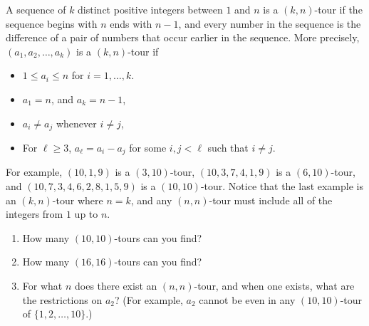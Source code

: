 A sequence of $k$ distinct positive integers between $1$ and $n$ is a $(k,n)$-tour if the sequence begins with $n$ ends with $n-1$, and every number in the sequence is the difference of a pair of numbers that occur earlier in the sequence. More precisely, $(a_{1},a_{2},\ldots,a_{k})$ is a $(k,n)$-tour if
\begin{itemize}
\item $1 \le a_{i} \le n$ for $i=1,\ldots,k$.
\item $a_{1}=n$, and $a_{k}=n-1$,
\item $a_{i} \ne a_{j}$ whenever $i \ne j$,
\item For $\ell \ge 3$, $a_{\ell}=a_{i}-a_{j}$ for some $i,j<\ell$ such that $i \ne j$.
\end{itemize}
For example, $(10, 1, 9)$ is a $(3,10)$-tour, $(10, 3, 7, 4, 1, 9)$ is a $(6,10)$-tour, and $(10, 7, 3, 4, 6, 2, 8, 1, 5, 9)$ is a $(10,10)$-tour. Notice that the last example is an $(k,n)$-tour where $n=k$, and any $(n,n)$-tour must include all of the integers from $1$ up to $n$.
\begin{enumerate}
\item How many $(10,10)$-tours can you find?
\item How many $(16,16)$-tours can you find?
\item For what $n$ does there exist an $(n, n)$-tour, and when one exists, what are the restrictions on $a_{2}$? (For example, $a_{2}$ cannot be even in any $(10,10)$-tour of $\{1,2,\ldots,10\}$.)
\end{enumerate}